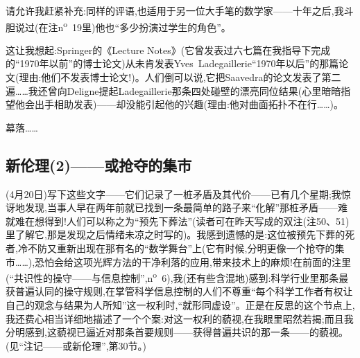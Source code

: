 
\dmark{}请允许我赶紧补充:同样的评语,也适用于另一位大手笔的数学家——十年之后,我斗胆说过(在注n\textsuperscript{o}~19里)他也“多少扮演过学生的角色”。 


这让我想起:Springer的《Lecture Notes》(它曾发表过六七篇在我指导下完成的“1970年以前”的博士论文)从未肯发表Yves~Ladegaillerie“1970年以后”的那篇论文(理由:他们不发表博士论文!)。人们倒可以说,它把Saavedra的论文发表了第二遍……我还曾向Deligne提起Ladegaillerie那条四处碰壁的漂亮同位结果(心里暗暗指望他会出手相助发表)——却没能引起他的兴趣(理由:他对曲面拓扑不在行……)。

幕落……

\subsection{新伦理(2)——或抢夺的集市}


(4月20日)写下这些文字——它们记录了一桩矛盾及其代价——已有几个星期;我惊讶地发现,当事人早在两年前就已找到一条最简单的路子来“化解”那桩矛盾——难就难在想得到!人们可以称之为“预先下葬法”(读者可在昨天写成的双注(注50、51)里了解它,那是发现之后情绪未凉之时写的)。我感到遗憾的是:这位被预先下葬的死者,冷不防又重新出现在那有名的“数学舞台”上(它有时候,分明更像一个抢夺的集市……),恐怕会给这项光辉方法的干净利落的应用,带来技术上的麻烦!在前面的注里(“共识性的操守——与信息控制”,n\textsuperscript{o}~6),我(还有些含混地)感到:科学行业里那条最获普遍认同的操守规则,在掌管科学信息控制的人们不尊重“每个科学工作者有权让自己的观念与结果为人所知”这一权利时,“就形同虚设”。正是在反思的这个节点上,我还费心相当详细地描述了一个个案:对这一权利的藐视,在我眼里昭然若揭;而且我分明感到,这藐视已逼近对那条首要规则——获得普遍共识的那一条——的藐视。(见“注记——或新伦理”,第30节。)

